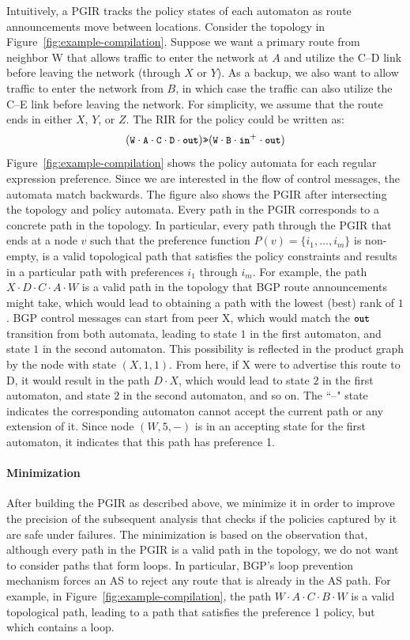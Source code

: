 \documentclass[10pt]{sigalternate052015}
\newcommand{\para}[1]{\paragraph*{\textbf{#1}}}
\newcommand{\set}[1]{\ensuremath{\{ #1 \} }}
\newcommand{\CD}[1]{\texttt{\small #1}}  %
\newcommand{\KW}[1]{\texttt{\small\bfseries{#1}}}
\newcommand{\Prefer}{\texttt{>>}}
\newcommand{\In}{\KW{in}}
\newcommand{\Out}{\KW{out}}
\begin{document}
Intuitively, a PGIR tracks the policy states of each automaton as route announcements move between locations.
%
Consider the topology in Figure~\ref{fig:example-compilation}. Suppose we want a primary route from neighbor W that allows traffic to enter the network at $A$ and utilize the C--D link before leaving the network (through $X$ or $Y$). As a backup, we also want to allow traffic to enter the network from $B$, in which case the traffic can also utilize the C--E link before leaving the network. For simplicity, we assume that the route ends in either $X$, $Y$, or $Z$. The RIR for the policy could be written as:
%
$$(\CD{W} \cdot \CD{A} \cdot \CD{C} \cdot \CD{D} \cdot \Out) \Prefer (\CD{W} \cdot \CD{B} \cdot \In^+ \cdot \Out)$$
%
Figure~\ref{fig:example-compilation} shows the policy automata for each regular expression preference. Since we are interested in the flow of control messages, the automata match backwards.
%
The figure also shows the PGIR after intersecting the topology and policy automata. Every path in the PGIR corresponds to a concrete path in the topology. In particular, every path through the PGIR that ends at a node $v$ such that the preference function $P(v) = \set{i_1, \dots, i_m}$ is non-empty, is a valid topological path that satisfies the policy constraints and results in a particular path with preferences $i_1$ through $i_m$.
%
For example, the path $X \cdot D \cdot C \cdot A \cdot W$ is a valid path in the topology that BGP route announcements might take, which would lead to obtaining a path with the lowest (best) rank of $1$.
BGP control messages can start from peer X, which would match the $\Out$ transition from both automata, leading to state $1$ in the first automaton, and state $1$ in the second automaton. This possibility is reflected in the product graph by the node with state $(X,1,1)$. From here, if X were to advertise this route to D, it would result in the path $D \cdot X$, which would lead to state $2$ in the first automaton, and state $2$ in the second automaton, and so on.
%
The ``--" state indicates the corresponding automaton cannot accept the current path or any extension of it. Since
node $(W,5,-)$ is in an accepting state for the first automaton, it indicates that this path has preference 1.

\para{Minimization}
After building the PGIR as described above,
we minimize it in order to improve the precision of the subsequent analysis that checks if the policies captured by it are safe under failures.
The minimization is based on the observation that, although every path in the PGIR is a valid path in the topology, we do not want to consider paths that form loops. In particular, BGP's loop prevention mechanism forces an AS to reject any route that is already in the AS path.
%
For example, in Figure~\ref{fig:example-compilation}, the path $W \cdot A \cdot C \cdot B \cdot W$ is a valid topological path, leading to a path that satisfies the preference 1 policy, but which contains a loop.
%
\end{document}
